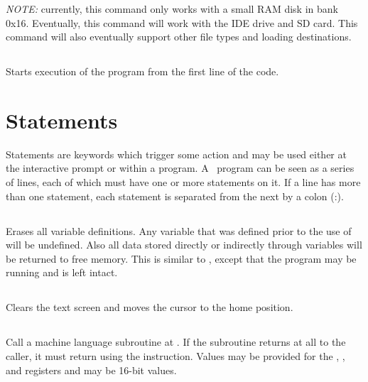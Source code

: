 \documentclass{report}
\begin{document}
    {\em NOTE:} currently, this command only works with a small
    RAM disk in bank 0x16. Eventually, this command will work with the IDE drive and SD card.
    This command will also eventually support other file types and loading destinations.

    \subsection*{}

    Starts execution of the program from the first line of the code.


    \section*{Statements}

    Statements are keywords which trigger some action and may be used either at the interactive prompt or within a program.
    A \BASIC\ program can be seen as a series of lines, each of which must have one or more statements on it.
    If a line has more than one statement, each statement is separated from the next by a colon (:).

    \subsection*{}

    Erases all variable definitions. Any variable that was defined prior to the use of  will be undefined.
    Also all data stored directly or indirectly through variables will be returned to free memory. This is similar to
    , except that the program may be running and is left intact.

    \subsection*{}

    Clears the text screen and moves the cursor to the home position.

    \subsection*{}

    Call a machine language subroutine at . If the subroutine returns at all to the caller, it
    must return using the  instruction. Values may be provided for the , , and
     registers and may be 16-bit values.
\end{document}
